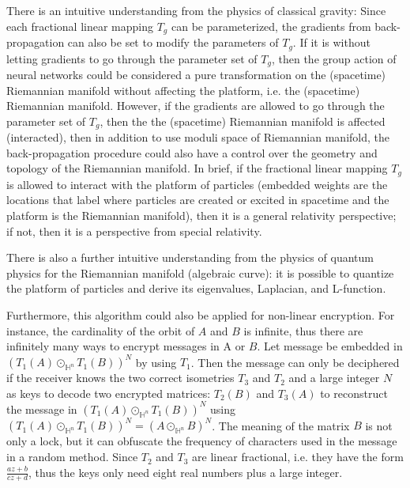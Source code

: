 \documentclass{article}
\theoremstyle{plain}
\theoremstyle{plain} %
\theoremstyle{definition}  %
\theoremstyle{remark}  %
\theoremstyle{plain}
\begin{document}
There is an intuitive understanding from the physics of classical gravity:
Since each fractional linear mapping $T_g$ can be parameterized\cite{seppala2011geometry, ford2004automorphic}, the gradients from back-propagation can also be set to modify the parameters of $T_g$. If it is without letting gradients to go through the parameter set of $T_g$, then the group action of neural networks could be considered a pure transformation on the (spacetime) Riemannian manifold without affecting the platform, i.e. the (spacetime) Riemannian manifold. However, if the gradients are allowed to go through the parameter set of $T_g$, then the the (spacetime) Riemannian manifold is affected (interacted), then in addition to use moduli space of Riemannian manifold, the back-propagation procedure could also have a control over the geometry and topology of the Riemannian manifold.
In brief, if the fractional linear mapping $T_g$ is allowed to interact with the platform of particles (embedded weights are the locations that label where particles are created or excited in spacetime and the platform is the Riemannian manifold), then it is a general relativity perspective\cite{misner1973gravitation}; if not, then it is a perspective from special relativity\cite{misner1973gravitation}.

There is also a further intuitive understanding from the physics of quantum physics for the Riemannian manifold (algebraic curve): it is possible to quantize the platform of particles and derive its eigenvalues, Laplacian, and L-function\cite{borthwick2007spectral}.

Furthermore, this algorithm could also be applied for non-linear encryption. For instance, the cardinality of the orbit of $A$ and $B$ is infinite, thus there are infinitely many ways to encrypt messages in A or $B$. Let message be embedded in $(T_1(A)\odot_{\mathbb{H}^n}T_1(B))^N$ by using $T_1$. Then the message can only be deciphered if the receiver knows the two correct isometries $T_3$ and $T_2$ and a large integer $N$ as keys to decode two encrypted matrices: $T_2(B)$ and $T_3(A)$ to reconstruct the message in $(T_1(A)\odot_{\mathbb{H}^n}T_1(B))^N$ using $(T_1(A)\odot_{\mathbb{H}^n}T_1(B))^N = (A\odot_{\mathbb{H}^n}B)^N$. The meaning of the matrix $B$ is not only a lock, but it can obfuscate the frequency of characters used in the message in a random method. Since $T_2$ and $T_3$ are linear fractional, i.e. they have the form $\frac{az+b}{cz+d}$, thus the keys only need eight real numbers plus a large integer.
\end{document}
